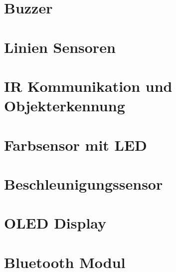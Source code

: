 \documentclass[a4paper,10pt,fleqn]{article}
\begin{document}
\section{Buzzer}

\section{Linien Sensoren}

\section{IR Kommunikation und Objekterkennung}

\section{Farbsensor mit LED}

\section{Beschleunigungssensor}

\section{OLED Display}

\section{Bluetooth Modul}
\end{document}
